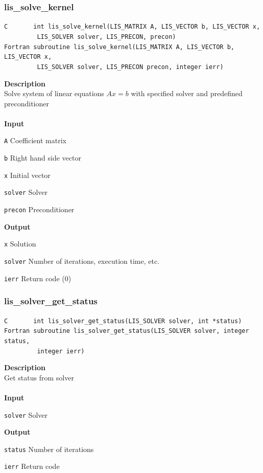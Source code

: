 \documentclass[a4paper]{article}
\newcommand{\namelistlabel}[1]{\mbox{#1}\hfill}
\newenvironment{namelist}[1]{%
 \begin{list}{}
  {\let\makelabel\namelistlabel
  \settowidth{\labelwidth}{#1}
  \setlength{\leftmargin}{1.1\labelwidth}}
}{%
\end{list}}
\begin{document}
  \subsubsection{lis\_solve\_kernel}
\begin{screen}
\verb|C       int lis_solve_kernel(LIS_MATRIX A, LIS_VECTOR b, LIS_VECTOR x,|\\
\verb|         LIS_SOLVER solver, LIS_PRECON, precon)|\\
\verb|Fortran subroutine lis_solve_kernel(LIS_MATRIX A, LIS_VECTOR b, LIS_VECTOR x,|\\
\verb|         LIS_SOLVER solver, LIS_PRECON precon, integer ierr)|
\end{screen}
{\bf Description}\\
\indent
Solve system of linear equations $Ax = b$ with specified solver and predefined preconditioner
\\ \\
\noindent
{\bf Input}
\begin{namelist}{XXXXXXXXXXXXXXXXXXXX}
\item[\tt A] Coefficient matrix
\item[\tt b] Right hand side vector
\item[\tt x] Initial vector
\item[\tt solver] Solver
\item[\tt precon] Preconditioner
\end{namelist}
{\bf Output}
\begin{namelist}{XXXXXXXXXXXXXXXXXXXX}
\item[\tt x] Solution
\item[\tt solver] Number of iterations, execution time, etc.
\item[\tt ierr] Return code (0)
\end{namelist}
\newpage
  \subsubsection{lis\_solver\_get\_status}
\begin{screen}
\verb|C       int lis_solver_get_status(LIS_SOLVER solver, int *status)|\\
\verb|Fortran subroutine lis_solver_get_status(LIS_SOLVER solver, integer status,|\\
\verb|         integer ierr)|
\end{screen}
{\bf Description}\\
\indent
Get status from solver
\\ \\
\noindent
{\bf Input}
\begin{namelist}{XXXXXXXXXXXXXXXXXXXX}
\item[\tt solver] Solver
\end{namelist}
{\bf Output}
\begin{namelist}{XXXXXXXXXXXXXXXXXXXX}
\item[\tt status] Number of iterations
\item[\tt ierr] Return code
\end{namelist}
\end{document}
